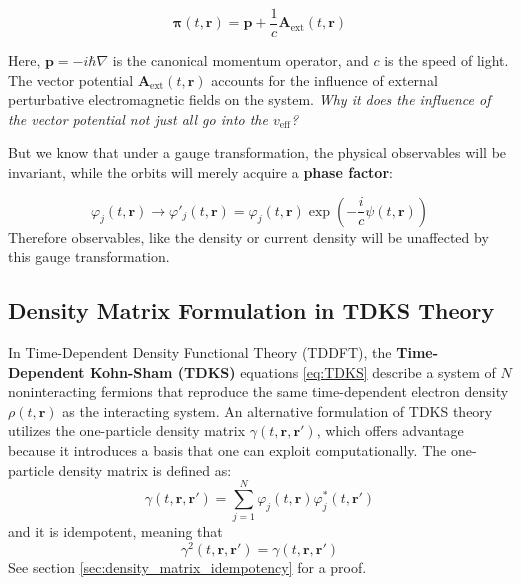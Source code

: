\begin{equation}
\boldsymbol{\pi}(t, \mathbf{r}) = \mathbf{p} + \frac{1}{c} \mathbf{A}_{\text{ext}}(t, \mathbf{r}) \label{eq:kineticMomentum}
\end{equation}

Here, \( \mathbf{p} = -i\hbar \nabla \) is the canonical momentum operator, and \( c \) is the speed of light. The vector potential \( \mathbf{A}_{\text{ext}}(t, \mathbf{r}) \) accounts for the influence of external perturbative electromagnetic fields on the system. \emph{Why it does the influence of the vector potential not just all go into the $v_{\text{eff}}$?}

But we know that under a gauge transformation, the physical observables will be invariant, while the orbits will merely acquire a \textbf{phase factor}:

\begin{equation}
\varphi_{j}(t, \mathbf{r}) \rightarrow \varphi'_{j}(t, \mathbf{r}) = \varphi_{j}(t, \mathbf{r}) \exp\left(-\frac{i}{c} \psi(t, \mathbf{r})\right) \label{eq:phaseFactor}
\end{equation}
Therefore observables, like the density or current density will be unaffected by this gauge transformation.


\subsection{Density Matrix Formulation in TDKS Theory}

In Time-Dependent Density Functional Theory (TDDFT), the \textbf{Time-Dependent Kohn-Sham (TDKS)} equations \ref{eq:TDKS} describe a system of $N$ noninteracting fermions that reproduce the same time-dependent electron density $\rho(t, \mathbf{r})$ as the interacting system. An alternative formulation of TDKS theory utilizes the one-particle density matrix $\gamma(t, \mathbf{r}, \mathbf{r}')$, which offers advantage because it introduces a basis that one can exploit computationally.
The one-particle density matrix is defined as:
\begin{equation}
\gamma(t, \mathbf{r}, \mathbf{r}') = \sum_{j=1}^{N} \varphi_{j}(t, \mathbf{r}) \varphi_{j}^{*}(t, \mathbf{r}') 
\label{eq:densityMatrix}
\end{equation}
and it is idempotent, meaning that
\begin{equation}
\gamma^{2}(t, \mathbf{r}, \mathbf{r}') = \gamma(t, \mathbf{r}, \mathbf{r}') \end{equation}
See section \ref{sec:density_matrix_idempotency} for a proof.





